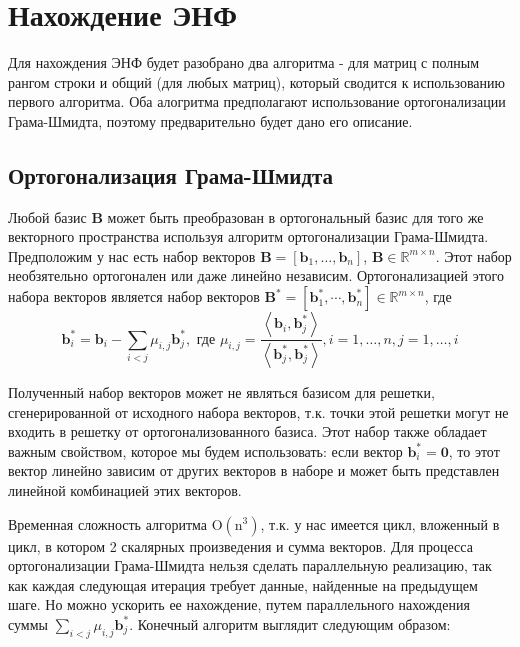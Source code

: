 \newpage

\section{Нахождение ЭНФ}

Для нахождения ЭНФ будет разобрано два алгоритма - для матриц с полным рангом строки и общий (для любых матриц), который сводится к использованию первого алгоритма. Оба алогритма предполагают использование ортогонализации Грама-Шмидта, поэтому предварительно будет дано его описание.

\subsection{Ортогонализация Грама-Шмидта}

Любой базис $ \mathbf{B} $ может быть преобразован в ортогональный базис для того же векторного пространства используя алгоритм ортогонализации Грама-Шмидта.
Предположим у нас есть набор векторов $ \mathbf{B} = [\mathbf{b}_1, \ldots, \mathbf{b}_n] $, $ \mathbf{B} \in \mathbb{R}^{m \times n} $. Этот набор необзятельно ортогонален или даже линейно независим. Ортогонализацией этого набора векторов является набор векторов $ \mathbf{B}^* = [\mathbf{b}^*_1, \cdots, \mathbf{b}^*_n] \in \mathbb{R}^{m \times n} $, где $$ \mathbf{b}^*_i = \mathbf{b}_i - \sum_{i < j} \mu_{i, j} \mathbf{b}^*_j, \text{ где } \mu_{i, j} = \frac{\left\langle \mathbf{b}_i, \mathbf{b}^*_j \right\rangle}{\left\langle \mathbf{b}^*_j, \mathbf{b}^*_j \right\rangle}, i = 1, \ldots, n, j = 1, \ldots, i $$

Полученный набор векторов может не являться базисом для решетки, сгенерированной от исходного набора векторов, т.к. точки этой решетки могут не входить в решетку от ортогонализованного базиса. Этот набор также обладает важным свойством, которое мы будем использовать: если вектор $ \mathbf{b}^*_i = \mathbf{0} $, то этот вектор линейно зависим от других векторов в наборе и может быть представлен линейной комбинацией этих векторов.

Временная сложность алгоритма $ \mathrm{O(n^3)} $, т.к. у нас имеется цикл, вложенный в цикл, в котором 2 скалярных произведения и сумма векторов. Для процесса ортогонализации Грама-Шмидта нельзя сделать параллельную реализацию, так как каждая следующая итерация требует данные, найденные на предыдущем шаге. Но можно ускорить ее нахождение, путем параллельного нахождения суммы $ \sum_{i < j} \mu_{i, j} \mathbf{b}^*_j $. Конечный алгоритм выглядит следующим образом:

